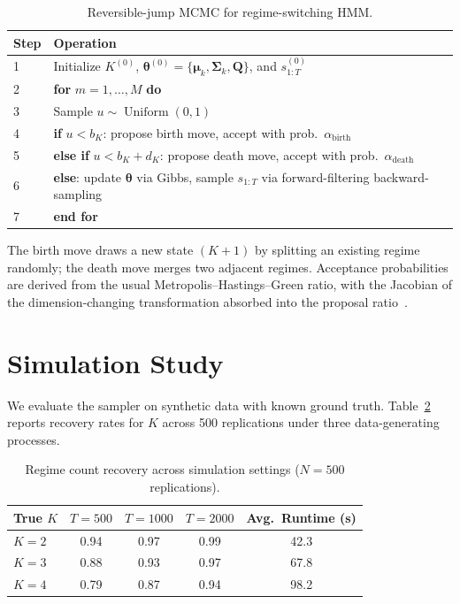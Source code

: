 \documentclass[12pt,oneside]{book}
\begin{document}
\begin{table}[H]
\centering
\caption{Reversible-jump MCMC for regime-switching HMM.}
\label{tab:algorithm}
\begin{tabularx}{0.92\textwidth}{@{}l >{\raggedright\arraybackslash}X@{}}
\toprule
\textbf{Step} & \textbf{Operation} \\
\midrule
1 & Initialize $K^{(0)}$, $\boldsymbol{\theta}^{(0)} = \{\boldsymbol{\mu}_k, \boldsymbol{\Sigma}_k, \mathbf{Q}\}$, and $s_{1:T}^{(0)}$ \\{}
2 & \textbf{for} $m = 1,\dots,M$ \textbf{do} \\{}
3 & \quad Sample $u \sim \operatorname{Uniform}(0,1)$ \\{}
4 & \quad \textbf{if} $u < b_K$: propose birth move, accept with prob.\ $\alpha_{\text{birth}}$ \\{}
5 & \quad \textbf{else if} $u < b_K + d_K$: propose death move, accept with prob.\ $\alpha_{\text{death}}$ \\{}
6 & \quad \textbf{else}: update $\boldsymbol{\theta}$ via Gibbs, sample $s_{1:T}$ via forward-filtering backward-sampling \\{}
7 & \textbf{end for} \\
\bottomrule
\end{tabularx}
\end{table}

The birth move draws a new state $(K+1)$ by splitting an existing regime randomly; the death move merges two adjacent regimes. Acceptance probabilities are derived from the usual Metropolis--Hastings--Green ratio, with the Jacobian of the dimension-changing transformation absorbed into the proposal ratio~\cite{green1995}.

\section{Simulation Study}

We evaluate the sampler on synthetic data with known ground truth. Table~\ref{tab:recovery} reports recovery rates for $K$ across 500 replications under three data-generating processes.

\begin{table}[H]
\centering
\caption{Regime count recovery across simulation settings ($N=500$ replications).}
\label{tab:recovery}
\begin{tabular}{@{}l c c c c@{}}
\toprule
\textbf{True $K$} & \textbf{$T=500$} & \textbf{$T=1000$} & \textbf{$T=2000$} & \textbf{Avg.\ Runtime (s)} \\
\midrule
$K=2$ & 0.94 & 0.97 & 0.99 & 42.3 \\{}
$K=3$ & 0.88 & 0.93 & 0.97 & 67.8 \\{}
$K=4$ & 0.79 & 0.87 & 0.94 & 98.2 \\
\bottomrule
\end{tabular}
\end{table}
\end{document}

